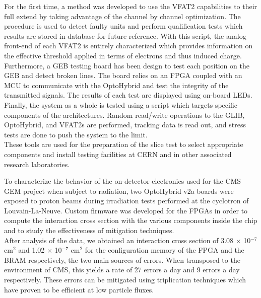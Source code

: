 For the first time, a method was developed to use the VFAT2 capabilities to their full extend by taking advantage of the channel by channel optimization. The procedure is used to detect faulty units and perform qualification tests which results are stored in database for future reference. With this script, the analog front-end of each VFAT2 is entirely characterized which provides information on the effective threshold applied in terms of electrons and thus induced charge. \\

Furthermore, a GEB testing board has been design to test each position on the GEB and detect broken lines. The board relies on an FPGA coupled with an MCU to communicate with the OptoHybrid and test the integrity of the transmitted signals. The results of each test are displayed using on-board LEDs. \\

Finally, the system as a whole is tested using a script which targets specific components of the architectures. Random read/write operations to the GLIB, OptoHybrid, and VFAT2s are performed, tracking data is read out, and stress tests are done to push the system to the limit. \\

These tools are used for the preparation of the slice test to select appropriate components and install testing facilities at CERN and in other associated research laboratories.




To characterize the behavior of the on-detector electronics used for the CMS GEM project when subject to radiation, two OptoHybrid v2a boards were exposed to proton beams during irradiation tests performed at the cyclotron of Louvain-La-Neuve. Custom firmware was developed for the FPGAs in order to compute the interaction cross section with the various components inside the chip and to study the effectiveness of mitigation techniques.  \\

After analysis of the data, we obtained an interaction cross section of 3.08 $ \times $ 10$^{-7}$ cm$^{2}$ and 1.02 $ \times $ 10$^{-7}$ cm$^{2}$ for the configuration memory of the FPGA and the BRAM respectively, the two main sources of errors. When transposed to the environment of CMS, this yields a rate of 27 errors a day and 9 errors a day respectively. These errors can be mitigated using triplication techniques which have proven to be efficient at low particle fluxes. \\

